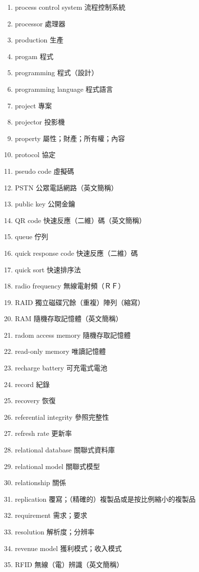 \begin{enumerate}
  \item process control system 流程控制系統
  \item processor 處理器
  \item production 生產
  \item progam 程式
  \item programming 程式（設計）
  \item programming language 程式語言
  \item project 專案
  \item projector 投影機
  \item property 屬性；財產；所有權；內容
  \item protocol 協定
  \item pseudo code 虛擬碼
  \item PSTN 公眾電話網路（英文簡稱）
  \item public key 公開金鑰
  \item QR code 快速反應（二維）碼（英文簡稱）
  \item queue 佇列
  \item quick response code 快速反應（二維）碼
  \item quick sort 快速排序法
  \item radio frequency 無線電射頻（ＲＦ）
  \item RAID 獨立磁碟冗餘（重複）陣列（縮寫）
  \item RAM 隨機存取記憶體（英文簡稱）
  \item radom access memory 隨機存取記憶體
  \item read-only memory 唯讀記憶體
  \item recharge battery 可充電式電池
  \item record 紀錄
  \item recovery 恢復
  \item referential integrity 參照完整性
  \item refresh rate 更新率
  \item relational database 關聯式資料庫
  \item relational model 關聯式模型
  \item relationship 關係
  \item replication 覆寫；（精確的）複製品或是按比例縮小的複製品
  \item requirement 需求；要求
  \item resolution 解析度；分辨率
  \item revenue model 獲利模式；收入模式
  \item RFID 無線（電）辨識（英文簡稱）

\end{enumerate}
